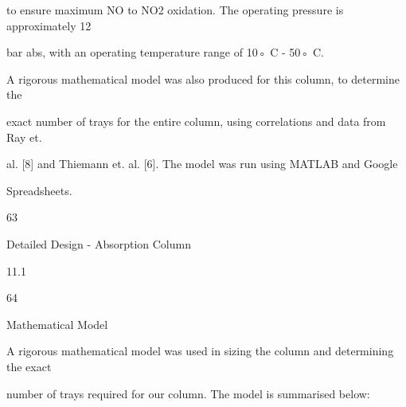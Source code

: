 \documentclass[a4paper,portrait,12pt]{article}
\begin{document}
\begin{flushleft}
to ensure maximum NO to NO2 oxidation. The operating pressure is approximately 12
\end{flushleft}


\begin{flushleft}
bar abs, with an operating temperature range of 10◦ C - 50◦ C.
\end{flushleft}


\begin{flushleft}
A rigorous mathematical model was also produced for this column, to determine the
\end{flushleft}


\begin{flushleft}
exact number of trays for the entire column, using correlations and data from Ray et.
\end{flushleft}


\begin{flushleft}
al. [8] and Thiemann et. al. [6]. The model was run using MATLAB and Google
\end{flushleft}


\begin{flushleft}
Spreadsheets.
\end{flushleft}





63





\begin{flushleft}
\newpage
Detailed Design - Absorption Column
\end{flushleft}





11.1





64





\begin{flushleft}
Mathematical Model
\end{flushleft}





\begin{flushleft}
A rigorous mathematical model was used in sizing the column and determining the exact
\end{flushleft}


\begin{flushleft}
number of trays required for our column. The model is summarised below:
\end{flushleft}
\end{document}
